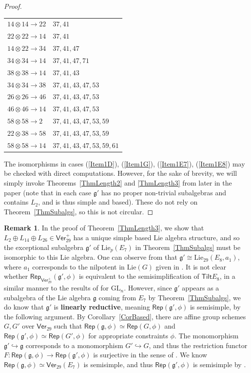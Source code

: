 \documentclass[11pt,a4paper,reqno]{amsart}
\theoremstyle{definition}
\newtheorem{remark}[theorem]{Remark}
\numberwithin{equation}{section}
\newcommand{\Ver}{\mathsf{Ver}}
\newcommand{\Rep}{\mathsf{Rep}}
\newcommand{\fg}{\mathfrak{g}}
\newcommand{\Lie}{\mathrm{Lie}}
\newcommand{\Tilt}{\mathsf{Tilt}}
\newcommand{\GL}{\mathrm{GL}}
\begin{document}
\begin{proof}
{\begin{tabular}{l|l}
$14\otimes14\to22$ & $37,41$\\
$22\otimes22\to14$ & $37,41$\\
$14\otimes22\to34$ & $37,41,47$\\
$34\otimes34\to14$ & $37,41,47,71$\\
$38\otimes38\to14$ & $37,41,43$\\
$34\otimes34\to38$ & $37,41,43,47,53$\\
$26\otimes26\to46$ & $37,41,43,47,53$\\
$46\otimes46\to14$ & $37,41,43,47,53$\\
$58\otimes58\to2$ & $37,41,43,47,53,59$\\
$22\otimes38\to58$ & $37,41,43,47,53,59$\\
$58\otimes58\to14$ & $37,41,43,47,53,59,61$
\end{tabular}
}\vspace{0.5em}

The isomorphisms in cases (\ref{Item1D}), (\ref{Item1G}), (\ref{Item1E7}), (\ref{Item1E8}) may be checked with direct computations. However, for the sake of brevity, we will simply invoke Theorems~\ref{ThmLength2} and \ref{ThmLength3} from later in the paper (note that in each case $\fg'$ has no proper non-trivial subalgebras and contains $L_2$, and is thus simple and based). These do not rely on Theorem~\ref{ThmSubalgs}, so this is not circular.
\end{proof}

\begin{remark}\label{RemE8a1}
In the proof of Theorem~\ref{ThmLength3}, we show that $L_2\oplus L_{14}\oplus L_{26}\in\Ver_{29}^+$ has a unique simple based Lie algebra structure, and so the exceptional subalgebra $\fg'$ of $\Lie_p(E_7)$ in Theorem~\ref{ThmSubalgs} must be isomorphic to this Lie algebra. One can observe from \cite[Table~10]{St} that $\fg'\cong\Lie_{29}(E_8,a_1)$, where $a_1$ corresponds to the nilpotent in $\Lie(G)$ given in \cite[Table~8]{St}. It is not clear whether $\Rep_{\Ver_{29}^+}(\fg',\phi)$ is equivalent to the semisimplification of $\Tilt E_8$, in a similar manner to the results of \cite{BEEO} for $\GL_n$. However, since $\fg'$ appears as a subalgebra of the Lie algebra $\fg$ coming from $E_7$ by Theorem~\ref{ThmSubalgs}, we do know that $\fg'$ is \textbf{linearly reductive}, meaning $\Rep(\fg',\phi)$ is semisimple, by the following argument. By Corollary~\ref{CorBased}, there are affine group schemes $G,G'$ over $\Ver_{29}$ such that $\Rep(\fg,\phi)\simeq\Rep(G,\phi)$ and $\Rep(\fg',\phi)\simeq\Rep(G',\phi)$ for appropriate constraints $\phi$. The monomorphism $\fg'\hookrightarrow\fg$ corresponds to a monomorphism $G'\hookrightarrow G$, and thus the restriction functor $F:\Rep(\fg,\phi)\to\Rep(\fg',\phi)$ is surjective in the sense of \cite{incompressible}. We know $\Rep(\fg,\phi)\simeq\Ver_{29}(E_7)$ is semisimple, and thus $\Rep(\fg',\phi)$ is semisimple by \cite[Example~3.3(ii),(iii)]{ftc}.
\end{remark}
\end{document}
